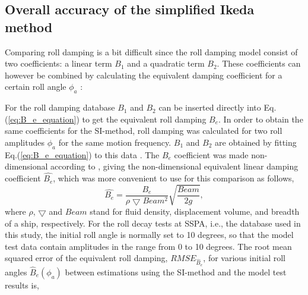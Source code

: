 \subsection{Overall accuracy of  the simplified Ikeda method}
\label{se:overall_comparison}
Comparing roll damping is a bit difficult since the roll damping model consist of two coefficients: a linear term $B_1$ and a quadratic term $B_2$. These coefficients can however be combined by calculating the equivalent damping coefficient for a certain roll angle $\phi_a$ \parencite{himeno_prediction_1981}:



For the roll damping database $B_1$ and $B_2$ can be inserted directly into Eq.(\ref{eq:B_e_equation}) to get the equivalent roll damping $B_e$. In order to obtain the same coefficients for the SI-method, roll damping was calculated for two roll amplitudes $\phi_a$ for the same motion frequency. $B_1$ and $B_2$ are obtained by fitting Eq.(\ref{eq:B_e_equation}) to this data \parencite{himeno_prediction_1981}. The $B_e$ coefficient was made non-dimensional according to \parencite{himeno_prediction_1981},  giving the non-dimensional equivalent linear damping coefficient $\hat{B_e}$, which was more convenient to use for this comparison as follows,
\begin{equation} \label{eq:be_eqvalent}
    \hat{B_e} = \frac{B_e}{\rho \bigtriangledown Beam^2} \sqrt{\frac{Beam}{2g}},
\end{equation}
where $\rho$, $\bigtriangledown$ and $Beam$ stand for fluid density, displacement volume, and breadth of a ship, respectively.
For the roll decay tests at SSPA, i.e., the database used in this study, the initial roll angle is normally set to 10 degrees, so that the model test data contain amplitudes in the range from 0 to 10 degrees. The root mean squared error of the equivalent roll damping, $RMSE_{\hat{B}_e}$, for various initial roll angles $\hat{B}_e(\phi_a)$ between estimations using the SI-method and the model test results is,

